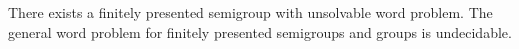 There exists a finitely presented semigroup with unsolvable word problem. The general word problem for finitely presented semigroups and groups is undecidable.
